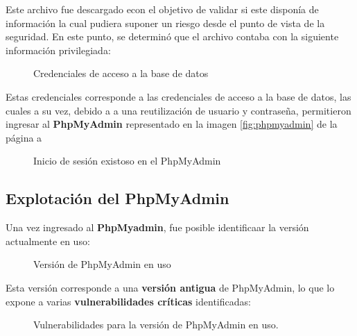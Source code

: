 \documentclass[a4paper]{article} %
\begin{document}
  \clearpage 
  Este archivo fue descargado econ el objetivo de validar si este disponía de información la cual pudiera suponer un riesgo 
  desde el punto de vista de la seguridad.
  En este punto, se determinó que el archivo contaba con la siguiente información privilegiada:

 
  \begin{figure}[h]
    \centering 
    \setlength{\fboxrule}{0.8pt}  
    \caption{Credenciales de acceso a la base de datos}
  \end{figure}

  Estas credenciales corresponde a las credenciales de acceso a la base de datos, las cuales a su vez,
  debido a a una reutilización de usuario y contraseña, permitieron ingresar al \textbf{PhpMyAdmin} representado en la imagen
  \ref{fig:phpmyadmin} de la página a \pageref{fig:phpmyadmin}

  \begin{figure}[h]
    \centering 
    \setlength{\fboxrule}{0.8pt}  
    \caption{Inicio de sesión existoso en el PhpMyAdmin}
  \end{figure}

  \clearpage
  \subsection{Explotación del PhpMyAdmin}
  Una vez ingresado al \textbf{PhpMyadmin}, fue posible identificaar la versión actualmente en uso:

  \vspace{0.2cm}

  \begin{figure}[h]
    \centering 
    \setlength{\fboxrule}{0.8pt}  
    \caption{Versión de PhpMyAdmin en uso}
  \end{figure}


  \vspace{0.3cm}
  Esta versión corresponde a una \textbf{versión antigua} de PhpMyAdmin, lo que lo expone a varias \textbf{vulnerabilidades críticas} identificadas: 

  \begin{figure}[h]
    \centering 
    \setlength{\fboxrule}{0.8pt}  
    \caption{Vulnerabilidades para la versión de PhpMyAdmin en uso.}
  \end{figure}
  
\end{document}
